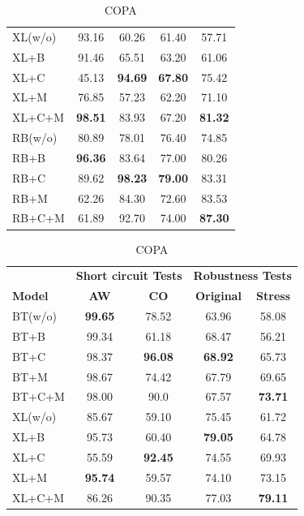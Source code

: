 \begin{table}[th!]
\begin{subtable}[t]{0.45\textwidth}
\begin{tabular}{l|cc|cc}
    \rowcolor{Gray}
    XL(w/o)&93.16&60.26&61.40&57.71\\
    XL+B&91.46&65.51&63.20&61.06\\
    XL+C&45.13&\textbf{94.69}&\textbf{67.80}&75.42\\
    XL+M&76.85&57.23&62.20&71.10\\
    XL+C+M&\textbf{98.51}&83.93&67.20&\textbf{81.32}\\
    
    \midrule
    
    \rowcolor{Gray}
    RB(w/o)&80.89&78.01&76.40&74.85\\
    RB+B&\textbf{96.36}&83.64&77.00&80.26\\
    RB+C&89.62&\textbf{98.23}&\textbf{79.00}&83.31\\
    RB+M&62.26&84.30&72.60&83.53\\
    RB+C+M&61.89&92.70&74.00&\textbf{87.30}\\
    \bottomrule
    \end{tabular}
    \caption{COPA}
    \end{subtable} 
    \hfill
    \begin{subtable}[t]{0.45\textwidth}
    \centering
    \begin{tabular}{l|cc|cc}\toprule
        & \multicolumn{2}{c|}{\bf Short circuit Tests} & \multicolumn{2}{c}{\bf Robustness Tests} \\ \cline{2-5}
    \textbf{Model} &\textbf{AW} &\textbf{CO} & \textbf{Original} &\textbf{Stress}\\ \hline
    \rowcolor{Gray}
    BT(w/o)&\textbf{99.65}&78.52&63.96&58.08\\
    BT+B&99.34&61.18&68.47&56.21\\
    BT+C&98.37&\textbf{96.08}&\textbf{68.92}&65.73\\
    BT+M&98.67&74.42&67.79&69.65\\
    BT+C+M&98.00&90.0&67.57&\textbf{73.71}\\
    \midrule
                       
    \rowcolor{Gray}
    XL(w/o)&85.67&59.10&75.45&61.72\\
    XL+B&95.73&60.40&\textbf{79.05}&64.78\\
    XL+C&55.59&\textbf{92.45}&74.55&69.93\\
    XL+M&\textbf{95.74}&59.57&74.10&73.15\\
    XL+C+M&86.26&90.35&77.03&\textbf{79.11}\\
    \midrule
    

\end{tabular}
\end{subtable}
\end{table}
